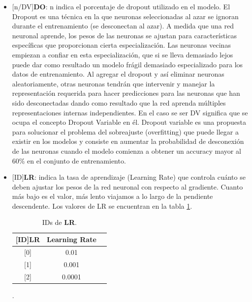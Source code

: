 \begin{onehalfspacing}
\begin{itemize}
    
    \item  {[n/DV]\textbf{DO}}: n indica el porcentaje de dropout utilizado en el modelo. El Dropout es una técnica en la que neuronas seleccionadas al azar se ignoran durante el entrenamiento (se desconectan al azar). A medida que una red neuronal aprende, los pesos de las neuronas se ajustan para características específicas que proporcionan cierta especialización. Las neuronas vecinas empiezan a confiar en esta especialización, que si se lleva demasiado lejos puede dar como resultado un modelo frágil demasiado especializado para los datos de entrenamiento. Al agregar el dropout y así eliminar neuronas aleatoriamente, otras neuronas tendrán que intervenir y manejar la representación requerida para hacer predicciones para las neuronas que han sido desconectadas dando como resultado que la red aprenda múltiples representaciones internas independientes. En el caso se ser DV significa que se ocupa el concepto Dropout Variable en él. Dropout variable es una propuesta para solucionar el problema del sobreajuste  (overfitting) que puede llegar a existir en los modelos y consiste en aumentar la probabilidad de desconexión de las neuronas cuando el modelo comienza a obtener un accuracy mayor al 60\% en el conjunto de entrenamiento.
    
     \item  {[ID]\textbf{LR}}: indica la tasa de aprendizaje (Learning Rate) que controla cuánto se deben ajustar los pesos de la red neuronal con respecto al gradiente. Cuanto más bajo es el valor, más lento viajamos a lo largo de la pendiente descendente. Los valores de LR se encuentran en la tabla \ref{tab:LR}.
     \begin{table}[h!]
        \centering
        \begin{tabular}{|c|c|c|}
            \hline 
            {[}ID{]}LR & Learning Rate\tabularnewline
            \hline 
            \hline 
            {[}0{]} & 0.01\tabularnewline
            \hline 
            {[}1{]} & 0.001\tabularnewline
            \hline 
            {[}2{]} & 0.0001\tabularnewline
            \hline 
        \end{tabular}%
        \caption{\footnotesize  IDs de \textbf{LR}.}.
        \label{tab:LR}
      \end{table} 
     

\end{itemize}
\end{onehalfspacing}
